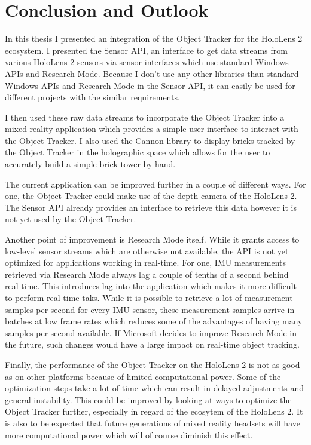 \chapter{Conclusion and Outlook}

In this thesis I presented an integration of the Object Tracker for the HoloLens 2 ecosystem. I presented the Sensor API, an interface to get data streams from various HoloLens 2 sensors via sensor interfaces which use standard Windows APIs and Research Mode. Because I don't use any other libraries than standard Windows APIs and Research Mode in the Sensor API, it can easily be used for different projects with the similar requirements.

I then used these raw data streams to incorporate the Object Tracker into a mixed reality application which provides a simple user interface to interact with the Object Tracker. I also used the Cannon library to display bricks tracked by the Object Tracker in the holographic space which allows for the user to accurately build a simple brick tower by hand.

The current application can be improved further in a couple of different ways. For one, the Object Tracker could make use of the depth camera of the HoloLens 2. The Sensor API already provides an interface to retrieve this data however it is not yet used by the Object Tracker.

Another point of improvement is Research Mode itself. While it grants access to low-level sensor streams which are otherwise not available, the API is not yet optimized for applications working in real-time. For one, IMU measurements retrieved via Research Mode always lag a couple of tenths of a second behind real-time. This introduces lag into the application which makes it more difficult to perform real-time taks. While it is possible to retrieve a lot of measurement samples per second for every IMU sensor, these measurement samples arrive in batches at low frame rates which reduces some of the advantages of having many samples per second available. If Microsoft decides to improve Research Mode in the future, such changes would have a large impact on real-time object tracking.

Finally, the performance of the Object Tracker on the HoloLens 2 is not as good as on other platforms because of limited computational power. Some of the optimization steps take a lot of time which can result in delayed adjustments and general instability. This could be improved by looking at ways to optimize the Object Tracker further, especially in regard of the ecosytem of the HoloLens 2. It is also to be expected that future generations of mixed reality headsets will have more computational power which will of course diminish this effect.